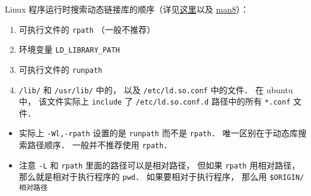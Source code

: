 Linux 程序运行时搜索动态链接库的顺序（详见\href{https://unix.stackexchange.com/questions/22926/where-do-executables-look-for-shared-objects-at-runtime}{这里}以及 \href{https://man7.org/linux/man-pages/man8/ld.so.8.html}{man8}）：
\begin{enumerate}
\item 可执行文件的 \verb|rpath| （一般不推荐）
\item 环境变量 \verb|LD_LIBRARY_PATH|
\item 可执行文件的 \verb|runpath|
\item \verb|/lib/| 和 \verb|/usr/lib/| 中的， 以及 \verb|/etc/ld.so.conf| 中的文件． 在 ubuntu 中， 该文件实际上 \verb|include| 了 \verb|/etc/ld.so.conf.d| 路径中的所有 \verb|*.conf| 文件．
\end{enumerate}

\begin{itemize}
\item 实际上 \verb|-Wl,-rpath| 设置的是 \verb|runpath| 而不是 \verb|rpath|． 唯一区别在于动态库搜索路径顺序． 一般并不推荐使用 \verb|rpath|．
\item 注意 \verb|-L| 和 \verb|rpath| 里面的路径可以是相对路径， 但如果 \verb|rpath| 用相对路径， 那么就是相对于执行程序的 \verb|pwd|． 如果要相对于执行程序， 那么用 \verb|$ORIGIN/相对路径|
\end{itemize}

